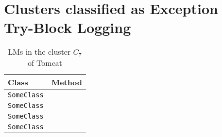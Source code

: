 \section{Clusters classified as Exception Try-Block Logging}

\begin{table}[!tbh]
\caption{LMs in the cluster $C_7$ of Tomcat}
\centering\begin{tabular}{ll}\toprule
Class&Method\\\midrule
\lstinline/SomeClass/&\raisebox{-2pt}{\lstinline/foo(int)/}\\
\lstinline/SomeClass/&\raisebox{-2pt}{\lstinline/foo(int)/}\\
\lstinline/SomeClass/&\raisebox{-2pt}{\lstinline/foo(int)/}\\
\lstinline/SomeClass/&\raisebox{-2pt}{\lstinline/foo(int)/}\\
\bottomrule
\end{tabular}
\end{table}
